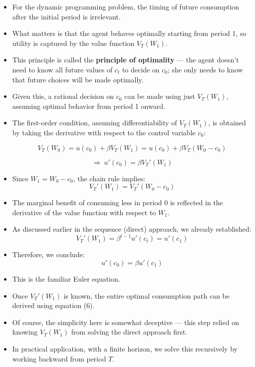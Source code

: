 \documentclass[12pt]{article}
\begin{document}
\begin{itemize}
    \item For the dynamic programming problem, the timing of future consumption after the initial period is irrelevant.

    \item What matters is that the agent behaves optimally starting from period 1, so utility is captured by the value function \( V_T(W_1) \).

    \item This principle is called the \textbf{principle of optimality} — the agent doesn't need to know all future values of \( c_t \) to decide on \( c_0 \); she only needs to know that future choices will be made optimally.

    \item Given this, a rational decision on \( c_0 \) can be made using just \( V_T(W_1) \), assuming optimal behavior from period 1 onward.

    \item The first-order condition, assuming differentiability of \( V_T(W_1) \), is obtained by taking the derivative with respect to the control variable \( c_0 \):
    
    \[
    V_T(W_0) = u(c_0) + \beta V_T(W_1)
            = u(c_0) + \beta V_T(W_0 - c_0)
    \]

    \[
    \Rightarrow \ u'(c_0) = \beta V_T'(W_1)
    \]

    \item Since \( W_1 = W_0 - c_0 \), the chain rule implies:
    \[
    V_T'(W_1) = V_T'(W_0 - c_0)
    \]
\end{itemize}

\begin{itemize}
    \item The marginal benefit of consuming less in period 0 is reflected in the derivative of the value function with respect to \( W_1 \).

    \item As discussed earlier in the sequence (direct) approach, we already established:
    \[
    V_T'(W_1) = \beta^{t - 1} u'(c_t) = u'(c_1) \tag{6}
    \]

    \item Therefore, we conclude:
    \[
    u'(c_0) = \beta u'(c_1)
    \]

    \item This is the familiar Euler equation.

    \item Once \( V_T'(W_1) \) is known, the entire optimal consumption path can be derived using equation (6).

    \item Of course, the simplicity here is somewhat deceptive — this step relied on knowing \( V_T(W_1) \) from solving the direct approach first.

    \item In practical application, with a finite horizon, we solve this recursively by working backward from period \( T \).
\end{itemize}
\end{document}
